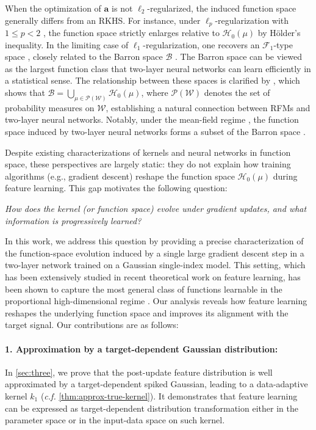 When the optimization of $\bm a$ is not $\ell_2$-regularized, the induced function space generally differs from an RKHS. For instance, under $\ell_p$-regularization with $1 \leq p < 2$ \citep{celentano2021minimum,chen2023duality}, the function space strictly enlarges relative to $\mathcal{H}_0(\mu)$ by Hölder’s inequality. In the limiting case of $\ell_1$-regularization, one recovers an $\mathcal{F}_1$-type space \citep{bach2017breaking}, closely related to the Barron space $\mathcal{B}$ \citep{barron1993universal,weinan2021barron}. The Barron space can be viewed as the largest function class that two-layer neural networks can learn efficiently in a statistical sense. The relationship between these spaces is clarified by \cite{chen2023duality}, which shows that $\mathcal{B} = \bigcup_{\mu \in \mathcal{P}(\mathcal{W})} \mathcal{H}_0(\mu)$, where $\mathcal{P}(\mathcal{W})$ denotes the set of probability measures on $\mathcal{W}$, establishing a natural connection between RFMs and two-layer neural networks. Notably, under the mean-field regime \citep{chizat2021convergence}, the function space induced by two-layer neural networks forms a subset of the Barron space \citep{wojtowytsch2020can}.

Despite existing characterizations of kernels and neural networks in function space, these perspectives are largely static: they do not explain how training algorithms (e.g., gradient descent) reshape the function space $\mathcal{H}_0(\mu)$ during feature learning. This gap motivates the following question:
\begin{center}
    \emph{How does the kernel (or function space) evolve under gradient updates, and what information is progressively learned?}
\end{center}
In this work, we address this question by providing a precise characterization of the function-space evolution induced by a single large gradient descent step in a two-layer network trained on a Gaussian single-index model. This setting, which has been extensively studied in recent theoretical work on feature learning, has been shown to capture the most general class of functions learnable in the proportional high-dimensional regime \citep{damian2022neural,ba2022high,dandi2023two}. Our analysis reveals how feature learning reshapes the underlying function space and improves its alignment with the target signal. Our contributions are as follows:

\paragraph{1. Approximation by a target-dependent Gaussian distribution:} In \cref{sec:three}, we prove that the post-update feature distribution is well approximated by a target-dependent spiked Gaussian, leading to a data-adaptive kernel $k_1$ (\emph{c.f.} \cref{thm:approx-true-kernel}). It demonstrates that feature learning can be expressed as target-dependent distribution transformation either in the parameter space or in the input-data space on such kernel.

